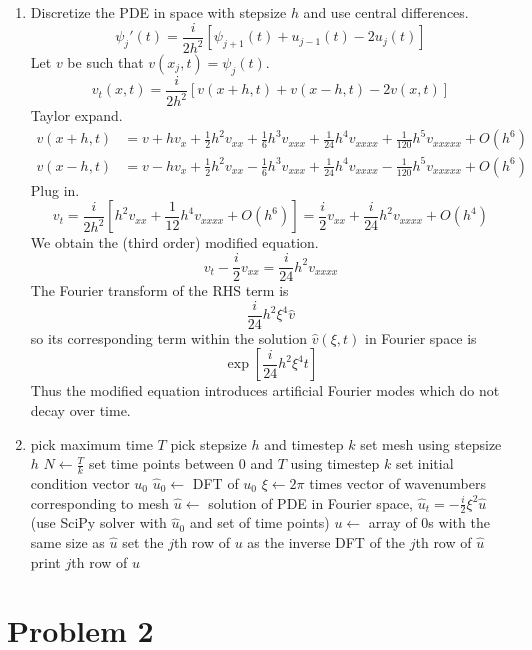\documentclass{article}
\newcommand{\sbr}[1]{\left[#1\right]}
\begin{document}
\begin{enumerate}[label=(\alph*)]
\item
Discretize the PDE in space with stepsize $h$ and use central differences.
$$\psi_j'(t) = \frac{i}{2h^2}[\psi_{j+1}(t) + u_{j-1}(t) - 2u_j(t)]$$
Let $v$ be such that $v(x_j,t)=\psi_j(t)$.
$$v_t(x,t) = \frac{i}{2h^2}[v(x+h,t) + v(x-h,t) - 2v(x,t)]$$
Taylor expand.
\begin{align*}
	v(x+h,t) &= v + hv_x + \frac12h^2v_{xx} + \frac16h^3v_{xxx} + \frac{1}{24}h^4v_{xxxx} + \frac{1}{120}h^5v_{xxxxx} + O(h^6)\\
	v(x-h,t) &= v - hv_x + \frac12h^2v_{xx} - \frac16h^3v_{xxx} + \frac{1}{24}h^4v_{xxxx} - \frac{1}{120}h^5v_{xxxxx} + O(h^6)
\end{align*}
Plug in.
$$v_t = \frac{i}{2h^2}\sbr{h^2v_{xx} + \frac{1}{12}h^4v_{xxxx} + O(h^6)}
= \frac i2v_{xx} + \frac{i}{24}h^2v_{xxxx} + O(h^4)$$
We obtain the (third order) modified equation.
$$v_t - \frac i2v_{xx} = \frac{i}{24}h^2v_{xxxx}$$
The Fourier transform of the RHS term is
$$\frac{i}{24}h^2\xi^4\hat v$$
so its corresponding term within the solution $\hat v(\xi,t)$ in Fourier space is
$$\exp[\frac{i}{24}h^2\xi^4t]$$
Thus the modified equation introduces artificial Fourier modes which do not decay over time.


\item
\begin{algorithmic}
	\State pick maximum time $T$
	\State pick stepsize $h$ and timestep $k$
	\State set mesh using stepsize $h$
	\State $N \gets \frac Tk$
	\State set time points between 0 and $T$ using timestep $k$
	\State set initial condition vector $u_0$
	\State $\hat u_0 \gets$ DFT of $u_0$
	\State $\xi \gets 2\pi$ times vector of wavenumbers corresponding to mesh
	\State $\hat u \gets$ solution of PDE in Fourier space, $\hat u_t=-\frac i2\xi^2\hat u$ (use SciPy solver with $\hat u_0$ and set of time points)
	\State $u \gets$ array of 0s with the same size as $\hat u$
		\State set the $j$th row of $u$ as the inverse DFT of the $j$th row of $\hat u$
	\EndFor
			\State print $j$th row of $u$
		\EndIf
	\EndFor
\end{algorithmic}

\end{enumerate}



\section*{Problem 2}
\end{document}
